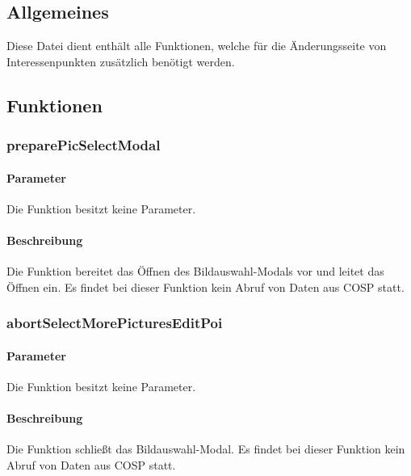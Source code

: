 \subsection{Allgemeines} Diese Datei dient enthält alle Funktionen, welche für die Änderungsseite von Interessenpunkten zusätzlich benötigt werden.
\newpage
\subsection{Funktionen}
\subsubsection{preparePicSelectModal}
\paragraph{Parameter} Die Funktion besitzt keine Parameter.
\paragraph{Beschreibung} Die Funktion bereitet das Öffnen des Bildauswahl-Modals vor und leitet das Öffnen ein. Es findet bei dieser Funktion kein Abruf von Daten aus {\glqq COSP\grqq} statt.
\subsubsection{abortSelectMorePicturesEditPoi}
\paragraph{Parameter} Die Funktion besitzt keine Parameter.
\paragraph{Beschreibung} Die Funktion schließt das Bildauswahl-Modal. Es findet bei dieser Funktion kein Abruf von Daten aus {\glqq COSP\grqq} statt.